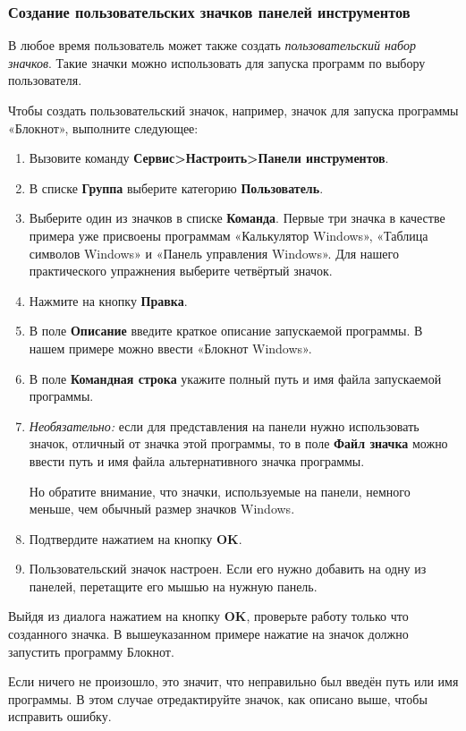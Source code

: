 ﻿\documentclass[a4paper,10pt]{article}
\begin{document}
 \subsubsection{Создание пользовательских значков панелей инструментов}
 В любое время пользователь может также создать \textit{пользовательский набор значков}. Такие значки можно использовать для запуска программ по выбору пользователя.
 
 Чтобы создать пользовательский значок, например, значок для запуска программы «Блокнот», выполните следующее:
 
 \begin{enumerate}
  \item Вызовите команду \textbf{Сервис>Настроить>Панели инструментов}.
  \item В списке \textbf{Группа} выберите категорию \textbf{Пользователь}.
  \item Выберите один из значков в списке \textbf{Команда}. Первые три значка в качестве примера уже присвоены программам «Калькулятор Windows», «Таблица символов Windows» и «Панель управления Windows». Для нашего практического упражнения выберите четвёртый значок.
  \item Нажмите на кнопку \textbf{Правка}.
  \item В поле \textbf{Описание} введите краткое описание запускаемой программы. В нашем примере можно ввести «Блокнот Windows».
  \item В поле \textbf{Командная строка} укажите полный путь и имя файла запускаемой программы.
  \item \textit{Необязательно:} если для представления на панели нужно использовать значок, отличный от значка этой программы, то в поле \textbf{Файл значка} можно ввести путь и имя файла альтернативного значка программы.
  
  Но обратите внимание, что значки, используемые на панели, немного меньше, чем обычный размер значков Windows.
  \item Подтвердите нажатием на кнопку \textbf{OK}.
  \item Пользовательский значок настроен. Если его нужно добавить на одну из панелей, перетащите его мышью на нужную панель.
 \end{enumerate}

 Выйдя из диалога нажатием на кнопку \textbf{OK}, проверьте работу только что созданного значка. В вышеуказанном примере нажатие на значок должно запустить программу Блокнот.
 
 Если ничего не произошло, это значит, что неправильно был введён путь или имя программы. В этом случае отредактируйте значок, как описано выше, чтобы исправить ошибку.
 
\end{document}
